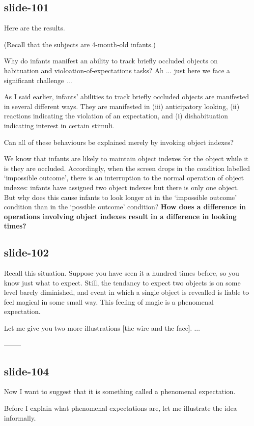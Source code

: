 \documentclass[12pt,\papersize]{extarticle}
\begin{document}
\subsection{slide-101}
Here are the results.

(Recall that the subjects are 4-month-old infants.)

Why do infants manifest an ability to track briefly occluded objects on
habituation and violoation-of-expectations tasks?
Ah ... just here we face a significant challenge ...

As I said earlier, infants’ abilities to track briefly
occluded objects are manifested in several different ways.
They are manifested in (iii) anticipatory looking, (ii) reactions
indicating the violation of an expectation, and (i) dishabituation
indicating interest in certain stimuli.

Can all of these behaviours be explained merely by invoking object
indexes?

We know that infants are likely to maintain object indexes for the object
while it is they are occluded.
Accordingly, when the screen drops in the condition labelled
‘impossible outcome’, there is an interruption to the normal
operation of object indexes: infants have assigned two object indexes
but there is only one object.
But why does this cause infants to look longer at in the
‘impossible outcome’ condition than in the ‘possible outcome’ condition?
\textbf{How does a difference in operations involving object indexes result
in a difference in looking times?}

\subsection{slide-102}
Recall this situation.
Suppose you have seen it a hundred times before, so you know just what
to expect.
Still, the tendancy to expect two objects is on some level barely
diminished, and event in which a single object is revealled
is liable to feel magical in some small way.
This feeling of magic is a phenomenal expectation.

Let me give you two more illustrations [the wire and the face]. ...

--------
\subsection{slide-104}
Now I want to suggest that it is something called a phenomenal expectation.

Before I explain what phenomenal expectations are, let me illustrate the
idea informally.
\end{document}
